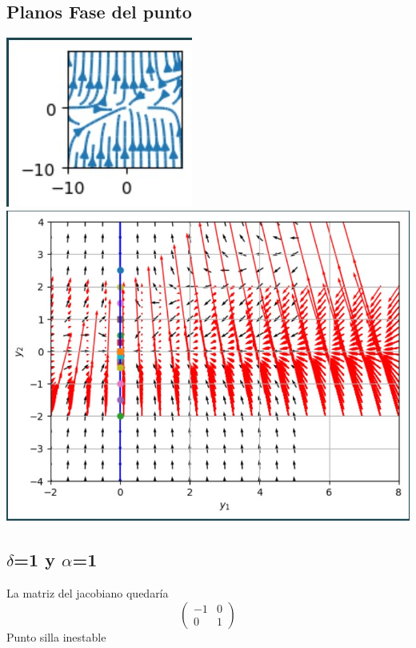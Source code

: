 \documentclass{article}
\begin{document}
         \subsection*{Planos Fase del punto }
         \noindent
         \includegraphics{isoclinas d=1 a=-2.jpg}
          \includegraphics{Diagrama de fases para a-2 d1.jpg}


     \subsection*{$\delta$=1 y $\alpha$=1}
       
        La matriz del jacobiano quedaría
        \[
         \left(
         \begin{array}{lc}
           -1 & 0\\
           0 & 1
         \end{array}
         \right)
         \]         
         Punto silla inestable
\end{document}
